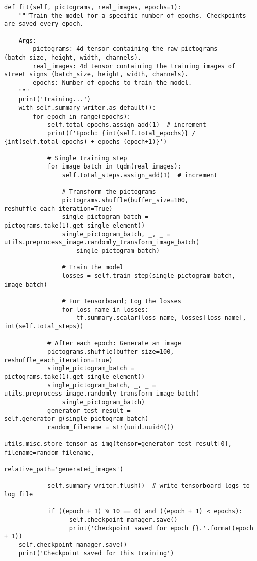 \begin{code}
  \begin{verbatim}
def fit(self, pictograms, real_images, epochs=1):
    """Train the model for a specific number of epochs. Checkpoints are saved every epoch.

    Args:
        pictograms: 4d tensor containing the raw pictograms (batch_size, height, width, channels).
        real_images: 4d tensor containing the training images of street signs (batch_size, height, width, channels).
        epochs: Number of epochs to train the model.
    """
    print('Training...')
    with self.summary_writer.as_default():
        for epoch in range(epochs):
            self.total_epochs.assign_add(1)  # increment
            print(f'Epoch: {int(self.total_epochs)} / {int(self.total_epochs) + epochs-(epoch+1)}')

            # Single training step
            for image_batch in tqdm(real_images):
                self.total_steps.assign_add(1)  # increment

                # Transform the pictograms
                pictograms.shuffle(buffer_size=100, reshuffle_each_iteration=True)
                single_pictogram_batch = pictograms.take(1).get_single_element()
                single_pictogram_batch, _, _ = utils.preprocess_image.randomly_transform_image_batch(
                    single_pictogram_batch)

                # Train the model
                losses = self.train_step(single_pictogram_batch, image_batch)

                # For Tensorboard; Log the losses
                for loss_name in losses:
                    tf.summary.scalar(loss_name, losses[loss_name], int(self.total_steps))

            # After each epoch: Generate an image
            pictograms.shuffle(buffer_size=100, reshuffle_each_iteration=True)
            single_pictogram_batch = pictograms.take(1).get_single_element()
            single_pictogram_batch, _, _ = utils.preprocess_image.randomly_transform_image_batch(
                single_pictogram_batch)
            generator_test_result = self.generator_g(single_pictogram_batch)
            random_filename = str(uuid.uuid4())
            utils.misc.store_tensor_as_img(tensor=generator_test_result[0], filename=random_filename,
                                            relative_path='generated_images')
            
            self.summary_writer.flush()  # write tensorboard logs to log file

            if ((epoch + 1) % 10 == 0) and ((epoch + 1) < epochs):
                  self.checkpoint_manager.save()
                  print('Checkpoint saved for epoch {}.'.format(epoch + 1))
    self.checkpoint_manager.save()
    print('Checkpoint saved for this training')
    
\end{verbatim}
  \label{lst:fit-full}
  \end{code}

